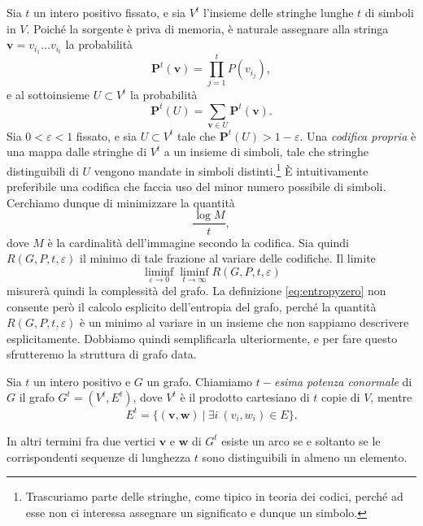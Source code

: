 Sia \(t\) un intero positivo fissato, e sia \(V^t\) l'insieme delle stringhe lunghe \(t\) di simboli in \(V\). Poiché la sorgente è priva di memoria, è naturale assegnare alla stringa \(\mathbf{v} = v_{i_1}\dots v_{i_t}\) la probabilità 
\begin{equation}
	\label{eq:probability}\mathbf{P}^t(\mathbf{v})=\prod_{j=1}^t P(v_{i_j}), 
\end{equation}
e al sottoinsieme \(U\subset V^{t}\) la probabilit\`a 
\begin{equation}
	\mathbf{P}^t(U)=\sum_{\mathbf{v}\in U} {\mathbf{P}^t(\mathbf{v})}. \nonumber 
\end{equation}
Sia \(0<\varepsilon<1\) fissato, e sia \(U\subset V^{t}\) tale che \(\mathbf{P}^t(U)>1-\varepsilon\). Una \emph{codifica propria} \`e una mappa dalle stringhe di \(V^t\) a un insieme di simboli, tale che stringhe distinguibili di \(U\) vengono mandate in simboli distinti.\footnote{Trascuriamo parte delle stringhe, come tipico in teoria dei codici, perché ad esse non ci interessa assegnare un significato e dunque un simbolo.} È intuitivamente preferibile una codifica che faccia uso del minor numero possibile di simboli. Cerchiamo dunque di minimizzare la quantità
\begin{equation}
	\frac{\log{M}}{t}, \nonumber 
\end{equation}
dove \(M\) è la cardinalità dell'immagine secondo la codifica. Sia quindi \(R(G,P,t,\varepsilon)\) il minimo di tale frazione al variare delle codifiche. Il limite 
\begin{equation}
	\label{eq:entropyzero} \liminf_{\varepsilon \to 0} \liminf_{t \to \infty} R(G,P,t,\varepsilon) 
\end{equation}
misurerà quindi la complessità del grafo. La definizione \eqref{eq:entropyzero} non consente però il calcolo esplicito dell'entropia del grafo, perché la quantità \(R(G,P,t,\varepsilon)\) è un minimo al variare in un insieme che non sappiamo descrivere esplicitamente. Dobbiamo quindi semplificarla ulteriormente, e per fare questo sfrutteremo la struttura di grafo data. 
\begin{definition}
	Sia \(t\) un intero positivo e \(G\) un grafo. Chiamiamo \emph{\(t-\)esima potenza conormale} di \(G\) il grafo \(G^t=(V^t, E^t)\), dove \(V^t\) è il prodotto cartesiano di \(t\) copie di \(V\), mentre
	\[E^t=\{(\mathbf{v},\mathbf{w})\ \vert\ \exists i\ (v_i, w_i)\in E\}.\]
\end{definition}
In altri termini fra due vertici \(\mathbf{v}\) e \(\mathbf{w}\) di \(G^t\) esiste un arco se e soltanto se le corrispondenti sequenze di lunghezza \(t\) sono distinguibili in almeno un elemento. 
